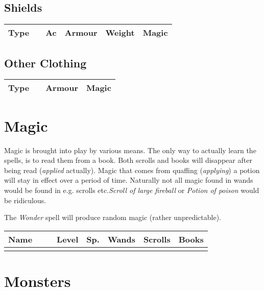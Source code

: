 \documentclass[11pt, a4paper]{article}
\begin{document}
\subsection*{Shields}

{\small
\begin{center}
\begin{tabular}{|c|c|r|r|r|p{5cm}|}
\hline
Type&&Ac&Armour&Weight&Magic\\
\hline
\hline

\hline
\end{tabular}
\end{center}
}

\subsection*{Other Clothing}

{\small
\begin{center}
\begin{tabular}{|c|c|r|l|}
\hline
Type&&Armour&Magic\\
\hline
\hline

\hline
\end{tabular}
\end{center}
}

\section*{Magic}

Magic is brought into play by various means.  The only way to actually
learn the spells, is to read them from a book. Both scrolls and books
will disappear after being read ({\em applied} actually). Magic that
comes from quaffing ({\em applying}) a potion will stay in effect over
a period of time. Naturally not all magic found in wands
would be found in e.g. scrolls etc.{\it Scroll of large fireball} or
{\it Potion of poison} would be ridiculous.

The {\it Wonder} spell will produce random magic (rather unpredictable).

{\small
\begin{longtable}{|l|c|c|r|r|c|c|c|}
\hline
Name& & &Level&Sp.&Wands&Scrolls&Books\\
\hline
\hline
\endhead
\hline
\endfoot

\end{longtable}
}

\section*{Monsters}
\end{document}
